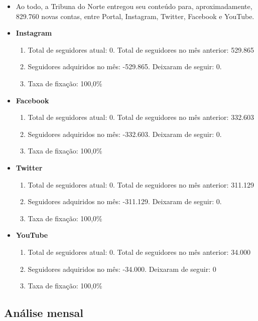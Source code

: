 \documentclass{article}%
\begin{document}
\begin{itemize}%
\item%
Ao todo, a Tribuna do Norte entregou seu conteúdo para, aproximadamente, 829.760 novas contas, entre Portal, Instagram, Twitter, Facebook e YouTube.%
\item%
\textbf{Instagram}%
\begin{enumerate}[label=-]%
\item%
Total de seguidores atual: 0. Total de seguidores no mês anterior: 529.865%
\item%
Seguidores adquiridos no mês: {-}529.865. Deixaram de seguir: 0.%
\item%
Taxa de fixação: 100,0\%%
\end{enumerate}%
\item%
\textbf{Facebook}%
\begin{enumerate}[label=-]%
\item%
Total de seguidores atual: 0. Total de seguidores no mês anterior: 332.603%
\item%
Seguidores adquiridos no mês: {-}332.603. Deixaram de seguir: 0.%
\item%
Taxa de fixação: 100,0\%%
\end{enumerate}%
\item%
\textbf{Twitter}%
\begin{enumerate}[label=-]%
\item%
Total de seguidores atual: 0. Total de seguidores no mês anterior: 311.129%
\item%
Seguidores adquiridos no mês: {-}311.129. Deixaram de seguir: 0.%
\item%
Taxa de fixação: 100,0\%%
\end{enumerate}%
\item%
\textbf{YouTube}%
\begin{enumerate}[label=-]%
\item%
Total de seguidores atual: 0. Total de seguidores no mês anterior: 34.000%
\item%
Seguidores adquiridos no mês: {-}34.000. Deixaram de seguir: 0%
\item%
Taxa de fixação: 100,0\%%
\end{enumerate}%
\end{itemize}

%
\newpage%
\subsection*{Análise mensal}%
\label{subsec:Anlisemensal}%
\end{document}
